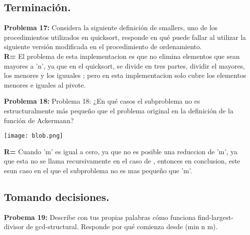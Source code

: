 \documentclass[letterpaper,12pt]{article}
\begin{document}
\subsection{Terminación.}

\textbf{Problema 17:} \text Considera la siguiente definición de smallers, uno de los procedimientos utilizados en quicksort, responde en qué puede fallar al utilizar la
siguiente versión modificada en el procedimiento de ordenamiento.\\
\textbf{R= } \text El problema de esta implementacion es que no elimina elementos que sean mayores a 'n', ya que en el quicksort, se divide en tres partes, dividir el mayores, los menores y los iguuales ; pero en esta implementacion solo cubre los elementos menores e iguales al pivote.

\newpage

\textbf{Problema 18:} \text Problema 18: ¿En qué casos el subproblema no es estructuralmente más pequeño que el problema original en la definición de la función de Ackermann?
\begin{center}
\texttt{[image: blob.png]}    
\end{center}
\textbf{R= } \text Cuando 'm' es igual a cero, ya que no es posible una reduccion de 'm', ya que esta no se llama recursivamente en el caso de , entonces en conclusion, este esun caso en el que el subproblema no es mas pequeño que 'm'.

\subsection{Tomando decisiones.}
\textbf{Probema 19: } \text Describe con tus propias palabras cómo funciona find-largest-divisor de gcd-structural. Responde por qué comienza desde (min n m).\\
\end{document}
